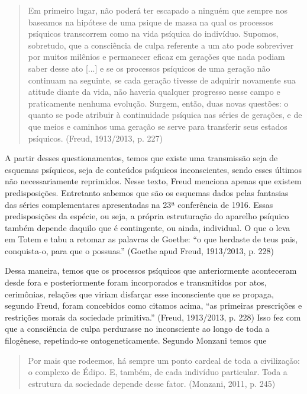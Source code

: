 \begin{quote}
Em primeiro lugar, não poderá ter escapado a ninguém que sempre nos
baseamos na hipótese de uma psique de massa na qual os processos
psíquicos transcorrem como na vida psíquica do indivíduo. Supomos,
sobretudo, que a consciência de culpa referente a um ato pode sobreviver
por muitos milênios e permanecer eficaz em gerações que nada podiam
saber desse ato {[}...{]} e se os processos psíquicos de uma geração não
continuam na seguinte, se cada geração tivesse de adquirir novamente sua
atitude diante da vida, não haveria qualquer progresso nesse campo e
praticamente nenhuma evolução. Surgem, então, duas novas questões: o
quanto se pode atribuir à continuidade psíquica nas séries de gerações,
e de que meios e caminhos uma geração se serve para transferir seus
estados psíquicos. (Freud, 1913/2013, p. 227)
\end{quote}

A partir desses questionamentos, temos que existe uma transmissão seja
de esquemas psíquicos, seja de conteúdos psíquicos inconscientes, sendo
esses últimos não necessariamente reprimidos. Nesse texto, Freud
menciona apenas que existem predisposições. Entretanto sabemos que são
os esquemas dados pelas fantasias das séries complementares apresentadas
na 23ª conferência de 1916. Essas predisposições da espécie, ou seja, a
própria estruturação do aparelho psíquico também depende daquilo que é
contingente, ou ainda, individual. O que o leva em Totem e tabu a
retomar as palavras de Goethe: ``o que herdaste de teus pais,
conquista-o, para que o possuas.'' (Goethe apud Freud, 1913/2013, p.
228)

Dessa maneira, temos que os processos psíquicos que anteriormente
aconteceram desde fora e posteriormente foram incorporados e
transmitidos por atos, cerimônias, relações que viriam disfarçar esse
inconsciente que se propaga, segundo Freud, foram concebidos como
citamos acima, ``as primeiras prescrições e restrições morais da
sociedade primitiva.'' (Freud, 1913/2013, p. 228) Isso fez com que a
consciência de culpa perdurasse no inconsciente ao longo de toda a
filogênese, repetindo-se ontogeneticamente. Segundo Monzani temos que

\begin{quote}
Por mais que rodeemos, há sempre um ponto cardeal de toda a civilização:
o complexo de Édipo. E, também, de cada indivíduo particular. Toda a
estrutura da sociedade depende desse fator. (Monzani, 2011, p. 245)
\end{quote}


